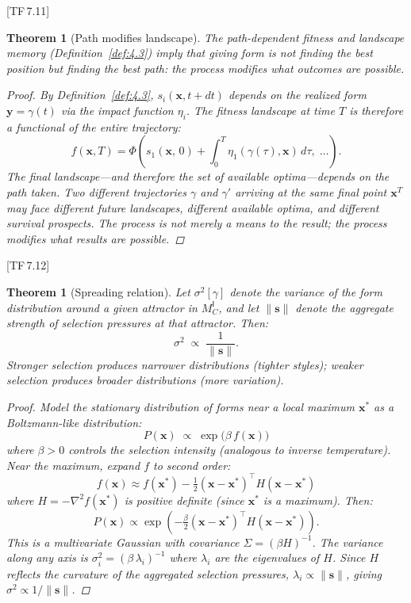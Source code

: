 \documentclass[11pt, a4paper]{article}
\theoremstyle{definition}
\theoremstyle{plain}
\newtheorem{theorem}[definition]{Theorem}
\theoremstyle{remark}
\newcommand{\MC}{M^{\mathsf{I}}_C}          %
\newcommand{\norm}[1]{\lVert #1 \rVert}
\newcommand{\TF}[1]{\textnormal{[TF\,#1]}}  %
\begin{document}
\TF{7.11}

\begin{theorem}[Path modifies landscape]\label{thm:9.3}
The path-dependent fitness and landscape memory (Definition~\ref{def:4.3})
imply that giving form is not finding the best position but finding the
best \emph{path}: the process modifies what outcomes are possible.

\begin{proof}
By Definition~\ref{def:4.3}, $s_i(\bm{x}, t+dt)$ depends on the
realized form $\bm{y} = \gamma(t)$ via the impact function $\eta_i$.
The fitness landscape at time $T$ is therefore a functional of the
entire trajectory:
\[
  f(\bm{x}, T) = \Phi\!\left(
    s_1\!\left(\bm{x},\, 0\right) +
    \int_0^T \eta_1(\gamma(\tau), \bm{x})\, d\tau,\;
    \ldots
  \right).
\]
The final landscape---and therefore the set of available optima---depends
on the path taken. Two different trajectories $\gamma$ and $\gamma'$
arriving at the same final point $\bm{x}^T$ may face different future
landscapes, different available optima, and different survival
prospects. The process is not merely a means to the result; the process
\emph{modifies} what results are possible. \qedhere
\end{proof}
\end{theorem}

\TF{7.12}

\begin{theorem}[Spreading relation]\label{thm:9.4}
Let $\sigma^2[\gamma]$ denote the variance of the form distribution
around a given attractor in $\MC$, and let $\norm{\bm{s}}$ denote the
aggregate strength of selection pressures at that attractor. Then:
\[
  \sigma^2 \;\propto\; \frac{1}{\norm{\bm{s}}}.
\]
Stronger selection produces narrower distributions (tighter styles);
weaker selection produces broader distributions (more variation).

\begin{proof}
Model the stationary distribution of forms near a local maximum
$\bm{x}^*$ as a Boltzmann-like distribution:
\[
  P(\bm{x}) \;\propto\; \exp\!\bigl(\beta \, f(\bm{x})\bigr)
\]
where $\beta > 0$ controls the selection intensity (analogous to
inverse temperature). Near the maximum, expand $f$ to second order:
\[
  f(\bm{x}) \approx f(\bm{x}^*) - \tfrac{1}{2}
  (\bm{x} - \bm{x}^*)^\top H (\bm{x} - \bm{x}^*)
\]
where $H = -\nabla^2 f(\bm{x}^*)$ is positive definite (since
$\bm{x}^*$ is a maximum). Then:
\[
  P(\bm{x}) \propto \exp\!\left(
    -\tfrac{\beta}{2}
    (\bm{x} - \bm{x}^*)^\top H (\bm{x} - \bm{x}^*)
  \right).
\]
This is a multivariate Gaussian with covariance
$\Sigma = (\beta H)^{-1}$. The variance along any axis is
$\sigma_i^2 = (\beta \, \lambda_i)^{-1}$ where $\lambda_i$ are the
eigenvalues of $H$. Since $H$ reflects the curvature of the aggregated
selection pressures, $\lambda_i \propto \norm{\bm{s}}$, giving
$\sigma^2 \propto 1/\norm{\bm{s}}$. \qedhere
\end{proof}
\end{theorem}
\end{document}
